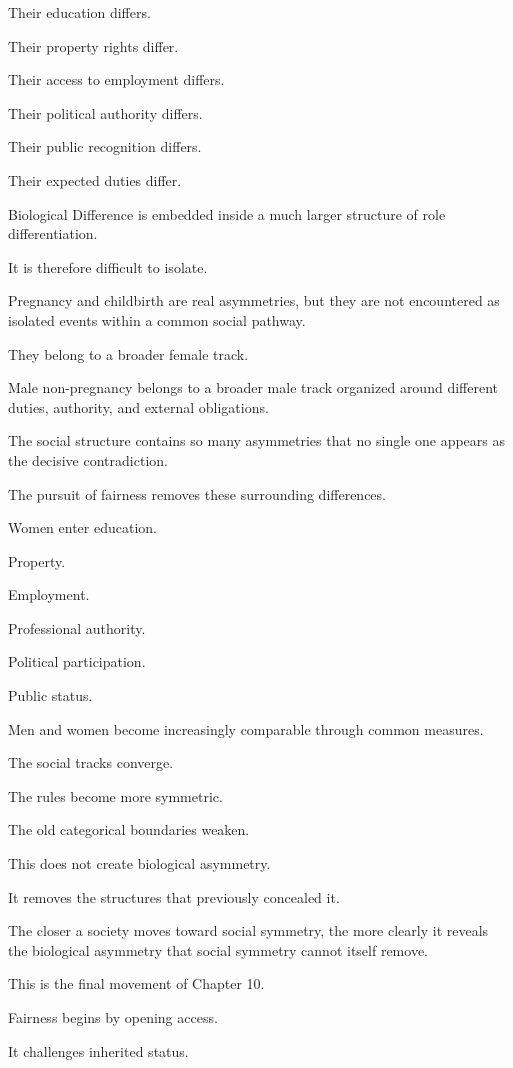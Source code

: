 Their education differs.

Their property rights differ.

Their access to employment differs.

Their political authority differs.

Their public recognition differs.

Their expected duties differ.

Biological Difference is embedded inside a much larger structure of role differentiation.

It is therefore difficult to isolate.

Pregnancy and childbirth are real asymmetries, but they are not encountered as isolated events within a common social pathway.

They belong to a broader female track.

Male non-pregnancy belongs to a broader male track organized around different duties, authority, and external obligations.

The social structure contains so many asymmetries that no single one appears as the decisive contradiction.

The pursuit of fairness removes these surrounding differences.

Women enter education.

Property.

Employment.

Professional authority.

Political participation.

Public status.

Men and women become increasingly comparable through common measures.

The social tracks converge.

The rules become more symmetric.

The old categorical boundaries weaken.

This does not create biological asymmetry.

It removes the structures that previously concealed it.

The closer a society moves toward social symmetry, the more clearly it reveals the biological asymmetry that social symmetry cannot itself remove.

This is the final movement of Chapter 10.

Fairness begins by opening access.

It challenges inherited status.

